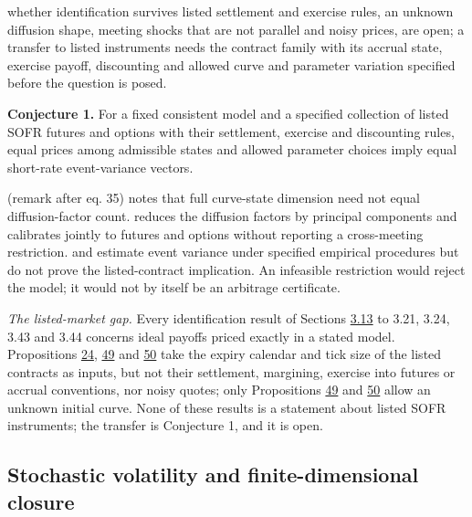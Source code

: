 \documentclass[11pt]{article}
\begin{document}
whether identification survives listed settlement and exercise rules, an unknown diffusion shape, meeting shocks that are not parallel and noisy prices, are open; a transfer to listed instruments needs the contract family with its accrual state, exercise payoff, discounting and allowed curve and parameter variation specified before the question is posed.

\textbf{Conjecture 1.} For a fixed consistent model and a specified collection of listed SOFR futures and options with their settlement, exercise and discounting rules, equal prices among admissible states and allowed parameter choices imply equal short-rate event-variance vectors.

\cite{gellert2021short} (remark after eq. 35) notes that full curve-state dimension need not equal diffusion-factor count. \cite{brace2024sofr} reduces the diffusion factors by principal components and calibrates jointly to futures and options without reporting a cross-meeting restriction. \cite{wright2020event} and \cite{zhong2026spanning} estimate event variance under specified empirical procedures but do not prove the listed-contract implication. An infeasible restriction would reject the model; it would not by itself be an arbitrage certificate.

\emph{The listed-market gap.} Every identification result of Sections \hyperref[sec:3.13]{3.13} to 3.21, 3.24, 3.43 and 3.44 concerns ideal payoffs priced exactly in a stated model. Propositions \hyperref[res:Proposition-24]{24}, \hyperref[res:Proposition-49]{49} and \hyperref[res:Proposition-50]{50} take the expiry calendar and tick size of the listed contracts as inputs, but not their settlement, margining, exercise into futures or accrual conventions, nor noisy quotes; only Propositions \hyperref[res:Proposition-49]{49} and \hyperref[res:Proposition-50]{50} allow an unknown initial curve. None of these results is a statement about listed SOFR instruments; the transfer is Conjecture 1, and it is open.

\subsection{Stochastic volatility and finite-dimensional closure}\label{sec:5.4}
\end{document}
